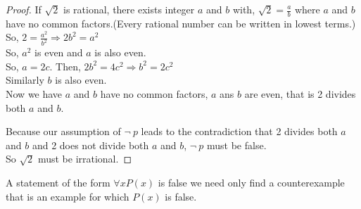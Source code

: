 \documentclass[12pt,oneside,a4paper]{book}
\theoremstyle{remark}
\theoremstyle{definition}
\newcommand{\px}{P(x)}
\begin{document}
\begin{proof}
    If \(\sqrt{2}\) is rational, there exists integer \(a\) and \(b\) with, \(\sqrt{2}=\frac{a}{b}\) where $ a $ and $ b $ have no common factors.(Every rational number can be written in lowest terms.)
    So, \(2=\frac{a^2}{b^2}\Rightarrow2b^2=a^2\) \\
    So, \(a^2\) is even and $ a $ is also even.\\
    So, \(a=2c\). Then, \(2b^2=4c^2\Rightarrow b^2=2c^2\)\\
    Similarly $ b $ is also even.\\
    Now we have $ a $ and $ b $ have no common factors, $ a $ ans $ b $ are even, that is 2 divides both $ a $ and $ b $.

    Because our assumption of \(\neg\ p\) leads to the contradiction that 2 divides both $ a $ and $ b $ and 2 does not divide both $ a $ and $ b $, \(\neg\ p\) must be false.\\
    So \(\sqrt2\) must be irrational.
\end{proof}
A statement of the form \(\forall x\px\) is false we need only find a counterexample that is an example for which \(\px\) is false.
\end{document}
